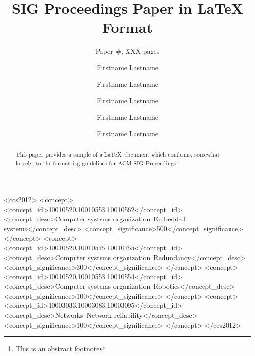 \documentclass[10pt,sigconf,anonymous]{acmart}
\begin{document}
\title{SIG Proceedings Paper in LaTeX Format}
\subtitle{Paper \#, XXX pages}

\author{Firstname Lastname}

\author{Firstname Lastname}

\author{Firstname Lastname}

\author{Firstname Lastname}

\author{Firstname Lastname}


\renewcommand{\shortauthors}{F. Lastname et al.}


\begin{abstract}
This paper provides a sample of a \LaTeX\ document which conforms,
somewhat loosely, to the formatting guidelines for
ACM SIG Proceedings.\footnote{This is an abstract footnote}
\end{abstract}

%
%
\begin{CCSXML}
<ccs2012>
 <concept>
  <concept_id>10010520.10010553.10010562</concept_id>
  <concept_desc>Computer systems organization~Embedded systems</concept_desc>
  <concept_significance>500</concept_significance>
 </concept>
 <concept>
  <concept_id>10010520.10010575.10010755</concept_id>
  <concept_desc>Computer systems organization~Redundancy</concept_desc>
  <concept_significance>300</concept_significance>
 </concept>
 <concept>
  <concept_id>10010520.10010553.10010554</concept_id>
  <concept_desc>Computer systems organization~Robotics</concept_desc>
  <concept_significance>100</concept_significance>
 </concept>
 <concept>
  <concept_id>10003033.10003083.10003095</concept_id>
  <concept_desc>Networks~Network reliability</concept_desc>
  <concept_significance>100</concept_significance>
 </concept>
</ccs2012>  
\end{CCSXML}
\end{document}

